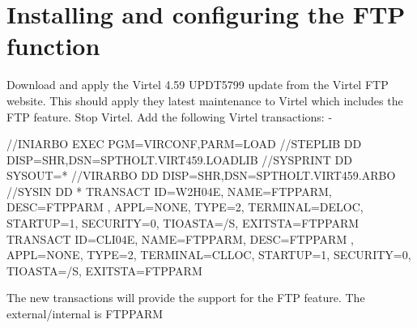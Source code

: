 \documentclass[letterpaper,10pt,english]{sphinxmanual}
\begin{document}
\chapter{Installing and configuring the FTP function}
\label{\detokenize{TN201905:installing-and-configuring-the-ftp-function}}
Download and apply the Virtel 4.59 UPDT5799 update from the Virtel FTP website. This should apply they latest maintenance to Virtel which includes the FTP feature.
Stop Virtel.
Add the following Virtel transactions: -

\begin{sphinxVerbatim}[commandchars=\\\{\}]
//INIARBO EXEC PGM=VIRCONF,PARM=LOAD
//STEPLIB  DD  DISP=SHR,DSN=SPTHOLT.VIRT459.LOADLIB
//SYSPRINT DD  SYSOUT=*
//VIRARBO  DD  DISP=SHR,DSN=SPTHOLT.VIRT459.ARBO
//SYSIN    DD  *
   TRANSACT ID=W2H\PYGZhy{}04E,                                             \PYGZhy{}
            NAME=FTPPARM,                                           \PYGZhy{}
            DESC=\PYGZsq{}FTPPARM   \PYGZsq{},                                      \PYGZhy{}
            APPL=\PYGZdl{}NONE\PYGZdl{},                                            \PYGZhy{}
            TYPE=2,                                                 \PYGZhy{}
            TERMINAL=DELOC,                                         \PYGZhy{}
            STARTUP=1,                                              \PYGZhy{}
            SECURITY=0,                                             \PYGZhy{}
            TIOASTA=\PYGZam{}/S,                                            \PYGZhy{}
            EXITSTA=FTPPARM
   TRANSACT ID=CLI\PYGZhy{}04E,                                             \PYGZhy{}
            NAME=FTPPARM,                                           \PYGZhy{}
            DESC=\PYGZsq{}FTPPARM   \PYGZsq{},                                      \PYGZhy{}
            APPL=\PYGZdl{}NONE\PYGZdl{},                                            \PYGZhy{}
            TYPE=2,                                                 \PYGZhy{}
            TERMINAL=CLLOC,                                         \PYGZhy{}
            STARTUP=1,                                              \PYGZhy{}
            SECURITY=0,                                             \PYGZhy{}
            TIOASTA=\PYGZam{}/S,                                            \PYGZhy{}
            EXITSTA=FTPPARM
\end{sphinxVerbatim}

The new transactions will provide the support for the FTP feature. The external/internal is FTPPARM
\end{document}
